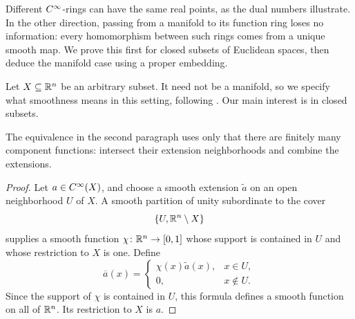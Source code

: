Different $C^\infty$-rings can have the same real points, as the dual numbers
illustrate. In the other direction, passing from a manifold to its function
ring loses no information: every homomorphism between such rings comes
from a unique smooth map. We prove this first for closed subsets of
Euclidean spaces, then deduce the manifold case using a proper embedding.

Let $X\subseteq\mathbb{R}^n$ be an arbitrary subset. It need not be a
manifold, so we specify what smoothness means in this setting, following
\citet[Chapter~I, Section~1]{Moerdijk_Reyes_Smooth_Infinitesimal_Analysis}.
Our main interest is in closed subsets.


The equivalence in the second paragraph uses only that there are finitely many
component functions: intersect their extension neighborhoods and combine the
extensions.


\begin{proof}
  Let $a\in C^\infty(X)$, and choose a smooth extension $\widetilde a$ on an open
  neighborhood $U$ of $X$. A smooth partition of unity subordinate to the
  cover
  \[
    \{U,\mathbb{R}^n\setminus X\}
  \]
  supplies a smooth function $\chi\colon\mathbb{R}^n\to[0,1]$ whose support is
  contained in $U$ and whose restriction to $X$ is one. Define
  \[
    \overline a(x)=
    \begin{cases}
      \chi(x)\widetilde a(x),&x\in U,\\
      0,&x\notin U.
    \end{cases}
  \]
  Since the support of $\chi$ is contained in $U$, this formula defines a
  smooth function on all of $\mathbb{R}^n$. Its restriction to $X$ is $a$.
\end{proof}

